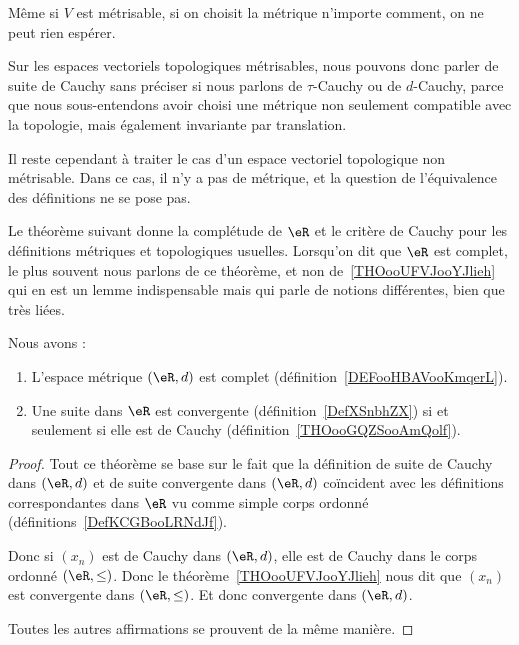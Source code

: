\begin{remark}  \label{REMooUFQYooUVCCjs}
    Même si \( V\) est métrisable, si on choisit la métrique n'importe comment, on ne peut rien espérer.
\end{remark}

\begin{normaltext}
    Sur les espaces vectoriels topologiques métrisables, nous pouvons donc parler de suite de Cauchy sans préciser si nous parlons de \( \tau\)-Cauchy ou de \( d\)-Cauchy, parce que nous sous-entendons avoir choisi une métrique non seulement compatible avec la topologie, mais également invariante par translation.

    Il reste cependant à traiter le cas d'un espace vectoriel topologique non métrisable. Dans ce cas, il n'y a pas de métrique, et la question de l'équivalence des définitions ne se pose pas.
\end{normaltext}

Le théorème suivant donne la complétude de \( \eR\) et le critère de Cauchy pour les définitions métriques et topologiques usuelles. Lorsqu'on dit que \( \eR\) est complet, le plus souvent nous parlons de ce théorème, et non de~\ref{THOooUFVJooYJlieh} qui en est un lemme indispensable mais qui parle de notions différentes, bien que très liées.
\begin{theorem}       \label{THOooNULFooYUqQYo}
    Nous avons :
    \begin{enumerate}
        \item
            L'espace métrique \( (\eR,d)\) est complet (définition~\ref{DEFooHBAVooKmqerL}).
        \item
            Une suite dans \( \eR\) est convergente (définition~\ref{DefXSnbhZX}) si et seulement si elle est de Cauchy (définition~\ref{THOooGQZSooAmQolf}).
    \end{enumerate}
\end{theorem}

\begin{proof}
    Tout ce théorème se base sur le fait que la définition de suite de Cauchy dans \( (\eR,d)\) et de suite convergente dans \( (\eR,d)\) coïncident avec les définitions correspondantes dans \( \eR\) vu comme simple corps ordonné (définitions~\ref{DefKCGBooLRNdJf}).

    Donc si \( (x_n)\) est de Cauchy dans \( (\eR,d)\), elle est de Cauchy dans le corps ordonné \( (\eR,\leq)\). Donc le théorème~\ref{THOooUFVJooYJlieh} nous dit que \( (x_n)\) est convergente dans \( (\eR,\leq)\). Et donc convergente dans \( (\eR,d)\).

    Toutes les autres affirmations se prouvent de la même manière.
\end{proof}

